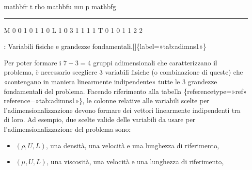 \documentclass[letterpaper,10pt,italian]{jupyterBook}
\begin{document}
\begin{sphinxVerbatim}[commandchars=\\\{\}]
   \PYGZdl{}\PYGZbs{}mathbf\PYGZob{}r\PYGZcb{}\PYGZdl{}   \PYGZdl{}t\PYGZdl{}   \PYGZdl{}\PYGZbs{}rho\PYGZdl{}   \PYGZdl{}\PYGZbs{}mathbf\PYGZob{}u\PYGZcb{}\PYGZdl{}   \PYGZdl{}\PYGZbs{}mu\PYGZdl{}   \PYGZdl{}p\PYGZdl{}   \PYGZdl{}\PYGZbs{}mathbf\PYGZob{}g\PYGZcb{}\PYGZdl{}
\end{sphinxVerbatim}


\bigskip\hrule\bigskip


\sphinxAtStartPar
M      0        0      1         0         1      1       0
L      1        0      \sphinxhyphen{}3        1        \sphinxhyphen{}1     \sphinxhyphen{}1       1
T      0        1      0         \sphinxhyphen{}1       \sphinxhyphen{}1     \sphinxhyphen{}2       \sphinxhyphen{}2

\sphinxAtStartPar
: Variabili fisiche e grandezze fondamentali.{[}{]}\{label=»tab:adim\sphinxhyphen{}ns\sphinxhyphen{}1»\}

\sphinxAtStartPar
Per poter formare i \(7-3 = 4\) gruppi adimensionali che caratterizzano il
problema, è necessario scegliere 3 variabili fisiche (o combinazione di
queste) che «contengano in maniera linearmente indipendente» tutte le 3
grandezze fondamentali del problema. Facendo riferimento alla tabella
\{reference\sphinxhyphen{}type=»ref»
reference=»tab:adim\sphinxhyphen{}ns\sphinxhyphen{}1»\}, le colonne relative alle variabili scelte
per l’adimensionalizzazione devono formare dei vettori linearmente
indipendenti tra di loro. Ad esempio, due scelte valide delle variabili
da usare per l’adimensionalizzazione del problema sono:
\begin{itemize}
\item {} 
\sphinxAtStartPar
\((\rho,U,L)\), una densità, una velocità e una lunghezza di
riferimento,

\item {} 
\sphinxAtStartPar
\((\mu,U,L)\), una viscosità, una velocità e una lunghezza di
riferimento,

\end{itemize}
\end{document}
